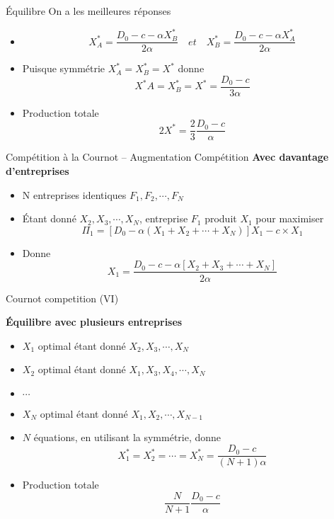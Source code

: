 \documentclass[handout]{beamer}
\newenvironment{iPar}[1]{\textbf{#1} \begin{itemize}}{\end{itemize}}
\begin{document}
\begin{frame}{Équilibre}
On a les meilleures réponses
\begin{itemize}
\item  $$X^*_A =  \frac{D_0 - c - \alpha X_B^*}{ 2 \alpha} \quad et \quad  X^*_B = \frac{D_0 - c -  \alpha X_A^*}{2 \alpha} $$

\item Puisque symmétrie $X^*_A = X^*_B = X^*$ donne $$X^*A = X^*_B = X^* = \frac{D_0 - c}{3\alpha}$$
\item Production totale  $$2 X^* = \frac{2}{3} \frac{D_0 - c}{\alpha}$$
\end{itemize}
\end{frame}


\begin{frame}{Compétition à la Cournot -- Augmentation Compétition}
\begin{iPar}{Avec davantage d'entreprises}
\item N entreprises identiques $F_1,F_2,\cdots,F_N$
\item Étant donné $X_2, X_3, \cdots, X_N$, entreprise $F_1$ produit $X_1$ pour maximiser $$\Pi_1 = [D_0 - \alpha(X_1 + X_2 + \cdots + X_N)]X_1 - c\times X_1$$
\item Donne $$X_1 = \frac{D_0 - c - \alpha[X_2 + X_3 + \cdots + X_N]}{ 2 \alpha}$$
\end{iPar}\end{frame}

\begin{frame}{Cournot competition (VI)}

\begin{iPar}{Équilibre avec plusieurs entreprises}
\item $X_1$ optimal étant donné $X_2, X_3, \cdots, X_N$
\item $X_2$ optimal étant donné $X_1,X_3,X_4, \cdots, X_N$
\item $\cdots$
\item $X_N$ optimal étant donné $X_1,X_2, \cdots, X_{N-1}$
\item $N$ équations, en utilisant la symmétrie, donne $$X_1^* = X_2^* = \cdots = X_N^* = \frac{D_0 - c}{(N+1) \alpha}$$ \item Production totale $$\frac{N}{N+1} \frac{D_0 -c}{\alpha}$$
\end{iPar}
\end{frame}
\end{document}
